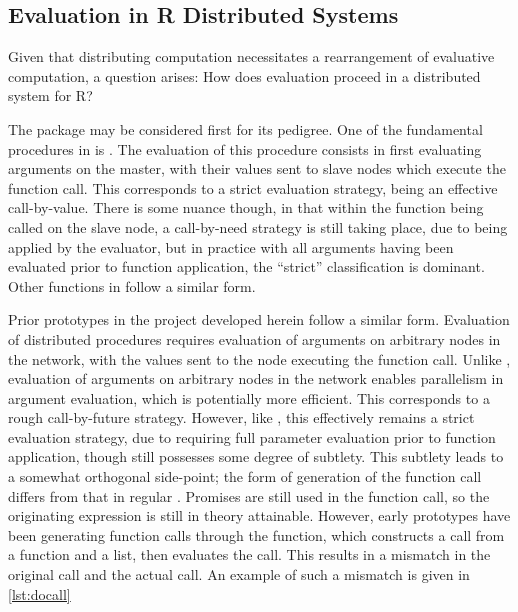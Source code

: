 \subsection{Evaluation in R Distributed Systems}\label{sec:rdisteval}

Given that distributing computation necessitates a rearrangement of evaluative computation, a question arises: How does evaluation proceed in a distributed system for R?

The  package may be considered first for its pedigree.
One of the fundamental procedures in  is \cite{tierney2018snow}.
The evaluation of this procedure consists in first evaluating arguments on the master, with their values sent to slave nodes which execute the function call.
This corresponds to a strict evaluation strategy, being an effective call-by-value.
There is some nuance though, in that within the function being called on the slave node, a call-by-need strategy is still taking place, due to being applied by the \R{} evaluator, but in practice with all arguments having been evaluated prior to function application, the ``strict'' classification is dominant.
Other functions in  follow a similar form.

Prior prototypes in the \lsr project developed herein follow a similar form.
Evaluation of distributed procedures requires evaluation of arguments on arbitrary nodes in the network, with the values sent to the node executing the function call.
Unlike , evaluation of arguments on arbitrary nodes in the network enables parallelism in argument evaluation, which is potentially more efficient.
This corresponds to a rough call-by-future strategy.
However, like , this effectively remains a strict evaluation strategy, due to requiring full parameter evaluation prior to function application, though still possesses some degree of subtlety.
This subtlety leads to a somewhat orthogonal side-point; the form of generation of the function call differs from that in regular \R{}.
Promises are still used in the function call, so the originating expression is still in theory attainable.
However, early \lsr{} prototypes have been generating function calls through the  function, which constructs a call from a function and a list, then evaluates the call.
This results in a mismatch in the original call and the actual call.
An example of such a mismatch is given in \cref{lst:docall}


